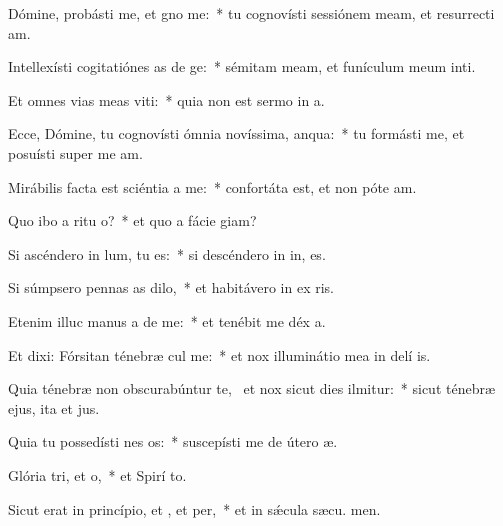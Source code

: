 \item Dómine, probásti me, et gno me:~* tu cognovísti sessiónem meam, et resurrecti am.
\item Intellexísti cogitatiónes as de ge:~* sémitam meam, et funículum meum inti.
\item Et omnes vias meas viti:~* quia non est sermo in  a.
\item Ecce, Dómine, tu cognovísti ómnia novíssima,  anqua:~* tu formásti me, et posuísti super me  am.
\item Mirábilis facta est sciéntia a  me:~* confortáta est, et non póte  am.
\item Quo ibo a ritu o?~* et quo a fácie  giam?
\item Si ascéndero in lum, tu  es:~* si descéndero in in, es.
\item Si súmpsero pennas as dilo,~* et habitávero in ex ris.
\item Etenim illuc manus a de me:~* et tenébit me déx a.
\item Et dixi: Fórsitan ténebræ cul me:~* et nox illuminátio mea in delí is.
\item Quia ténebræ non obscurabúntur  te,~\pscross{} et nox sicut dies ilmitur:~* sicut ténebræ ejus, ita et  jus.
\item Quia tu possedísti nes os:~* suscepísti me de útero  æ.
\item Glória tri, et o,~* et Spirí to.
\item Sicut erat in princípio, et , et per,~* et in sǽcula sæcu. men.
